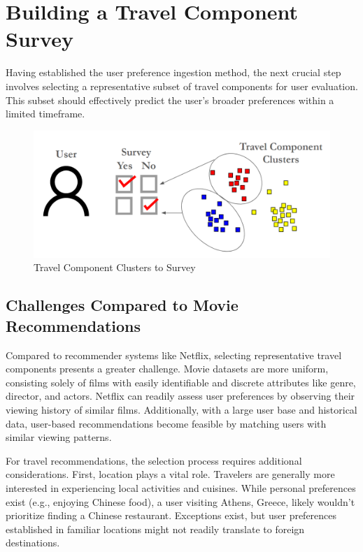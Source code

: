 \documentclass[12pt,a4paper]{report}
\begin{document}
\section{Building a Travel Component Survey}

Having established the user preference ingestion method, the next crucial step involves selecting a representative subset of travel components for user evaluation. This subset should effectively predict the user's broader preferences within a limited timeframe.

\begin{figure}[H]
    \centering
    \includegraphics[scale=.6]{travelclusterdemo}
    \caption{Travel Component Clusters to Survey}
\end{figure}

\subsection{Challenges Compared to Movie Recommendations}
Compared to recommender systems like Netflix, selecting representative travel components presents a greater challenge. Movie datasets are more uniform, consisting solely of films with easily identifiable and discrete attributes like genre, director, and actors. Netflix can readily assess user preferences by observing their viewing history of similar films. Additionally, with a large user base and historical data, user-based recommendations become feasible by matching users with similar viewing patterns.

For travel recommendations, the selection process requires additional considerations.  First, location plays a vital role.  Travelers are generally more interested in experiencing local activities and cuisines. While personal preferences exist (e.g., enjoying Chinese food), a user visiting Athens, Greece, likely wouldn't prioritize finding a Chinese restaurant.  Exceptions exist, but user preferences established in familiar locations might not readily translate to foreign destinations.
\end{document}
